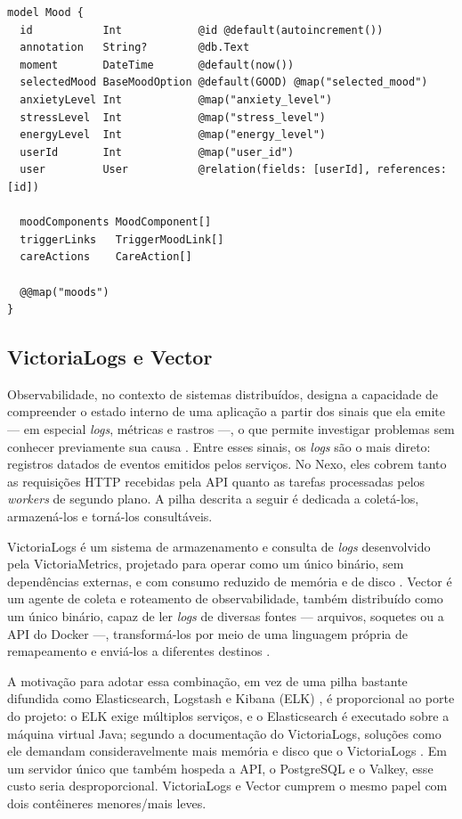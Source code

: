 \begin{lstlisting}[caption={Trecho do esquema Prisma para o registro de humor}, label={lst:prisma-schema}]
model Mood {
  id           Int            @id @default(autoincrement())
  annotation   String?        @db.Text
  moment       DateTime       @default(now())
  selectedMood BaseMoodOption @default(GOOD) @map("selected_mood")
  anxietyLevel Int            @map("anxiety_level")
  stressLevel  Int            @map("stress_level")
  energyLevel  Int            @map("energy_level")
  userId       Int            @map("user_id")
  user         User           @relation(fields: [userId], references: [id])

  moodComponents MoodComponent[]
  triggerLinks   TriggerMoodLink[]
  careActions    CareAction[]

  @@map("moods")
}
\end{lstlisting}


\subsection{VictoriaLogs e Vector}

Observabilidade, no contexto de sistemas distribuídos, designa a capacidade de
compreender o estado interno de uma aplicação a partir dos sinais que ela emite
--- em especial \textit{logs}, métricas e rastros ---, o que permite investigar
problemas sem conhecer previamente sua causa \citep{opentelemetry:2026}. Entre
esses sinais, os \textit{logs} são o mais direto: registros datados de eventos
emitidos pelos serviços. No Nexo, eles cobrem tanto as requisições HTTP
recebidas pela API quanto as tarefas processadas pelos \textit{workers} de
segundo plano. A pilha descrita a seguir é dedicada a coletá-los, armazená-los
e torná-los consultáveis.

VictoriaLogs é um sistema de armazenamento e consulta de \textit{logs}
desenvolvido pela VictoriaMetrics, projetado para operar como um único binário,
sem dependências externas, e com consumo reduzido de memória e de disco
\citep{victorialogs:2026}. Vector é um agente de coleta e roteamento de
observabilidade, também distribuído como um único binário, capaz de ler
\textit{logs} de diversas fontes --- arquivos, soquetes ou a API do Docker ---,
transformá-los por meio de uma linguagem própria de remapeamento e enviá-los a
diferentes destinos \citep{vector:2026}.

A motivação para adotar essa combinação, em vez de uma pilha bastante difundida
como Elasticsearch, Logstash e Kibana (ELK) \citep{elastic:2026}, é
proporcional ao porte do projeto: o ELK exige múltiplos serviços, e o
Elasticsearch é executado sobre a máquina virtual Java; segundo a documentação
do VictoriaLogs, soluções como ele demandam consideravelmente mais memória e
disco que o VictoriaLogs \citep{victorialogs:2026}. Em um servidor único que
também hospeda a API, o PostgreSQL e o Valkey, esse custo seria
desproporcional. VictoriaLogs e Vector cumprem o mesmo papel com dois
contêineres menores/mais leves.

